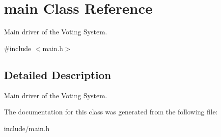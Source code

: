 \hypertarget{classmain}{}\section{main Class Reference}
\label{classmain}


Main driver of the Voting System.  




{\ttfamily \#include $<$main.\+h$>$}



\subsection{Detailed Description}
Main driver of the Voting System. 

The documentation for this class was generated from the following file\+:\begin{DoxyCompactItemize}
\item 
include/main.\+h\end{DoxyCompactItemize}
